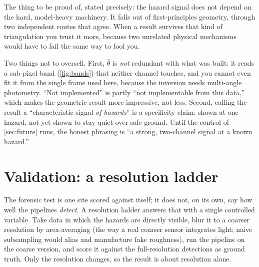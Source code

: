 \documentclass[11pt]{article}
\begin{document}
\begin{plainbox}
The thing to be proud of, stated precisely: the hazard signal does not depend on the
hard, model-heavy machinery. It falls out of first-principles geometry, through two
independent routes that agree. When a result survives that kind of triangulation you
trust it more, because two unrelated physical mechanisms would have to fail the same
way to fool you.
\end{plainbox}

\begin{limitbox}
Two things not to oversell. First, $\bar\theta$ is \emph{not} redundant with what was
built: it reads a sub-pixel band (\cref{fig:bands}) that neither channel touches, and
you cannot even fit it from the single frame used here, because the inversion needs
multi-angle photometry. ``Not implemented'' is partly ``not implementable from this
data,'' which makes the geometric result more impressive, not less. Second, calling
the result a ``characteristic signal \emph{of hazards}'' is a specificity claim:
shown at one hazard, not yet shown to stay quiet over safe ground. Until the control
of \cref{sec:future} runs, the honest phrasing is ``a strong, two-channel signal at a
known hazard.''
\end{limitbox}

\section{Validation: a resolution ladder}
\label{sec:validation}

The forensic test is one site scored against itself; it does not, on its own, say how
well the pipelines \emph{detect}. A resolution ladder answers that with a single
controlled variable. Take data in which the hazards are directly visible, blur it to a
coarser resolution by area-averaging (the way a real coarser sensor integrates light;
naive subsampling would alias and manufacture fake roughness), run the pipeline on the
coarse version, and score it against the full-resolution detections as ground truth.
Only the resolution changes, so the result is about resolution alone.
\end{document}

